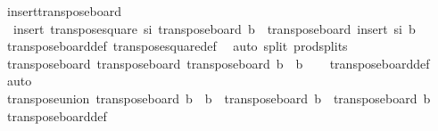 \begin{isabellebody}
\endisatagproof
{\isafoldproof}%
%
\isadelimproof
\isanewline
%
\endisadelimproof
\isanewline
{}\isamarkupfalse%
\ insert{\isacharunderscore}{\kern0pt}transpose{\isacharunderscore}{\kern0pt}board{\isacharcolon}{\kern0pt}\ \isanewline
\ \ {\isachardoublequoteopen}insert\ {\isacharparenleft}{\kern0pt}transpose{\isacharunderscore}{\kern0pt}square\ s\isactrlsub i{\isacharparenright}{\kern0pt}\ {\isacharparenleft}{\kern0pt}transpose{\isacharunderscore}{\kern0pt}board\ b{\isacharparenright}{\kern0pt}\ {\isacharequal}{\kern0pt}\ transpose{\isacharunderscore}{\kern0pt}board\ {\isacharparenleft}{\kern0pt}insert\ s\isactrlsub i\ b{\isacharparenright}{\kern0pt}{\isachardoublequoteclose}\isanewline
%
\isadelimproof
\ \ %
\endisadelimproof
%
\isatagproof
{}\isamarkupfalse%
\ transpose{\isacharunderscore}{\kern0pt}board{\isacharunderscore}{\kern0pt}def\ transpose{\isacharunderscore}{\kern0pt}square{\isacharunderscore}{\kern0pt}def\ \isamarkupfalse%
\ {\isacharparenleft}{\kern0pt}auto\ split{\isacharcolon}{\kern0pt}\ prod{\isachardot}{\kern0pt}splits{\isacharparenright}{\kern0pt}%
\endisatagproof
{\isafoldproof}%
%
\isadelimproof
\isanewline
%
\endisadelimproof
\isanewline
{}\isamarkupfalse%
\ transpose{\isacharunderscore}{\kern0pt}board{}{\isacharcolon}{\kern0pt}\ {\isachardoublequoteopen}transpose{\isacharunderscore}{\kern0pt}board\ {\isacharparenleft}{\kern0pt}transpose{\isacharunderscore}{\kern0pt}board\ b{\isacharparenright}{\kern0pt}\ {\isacharequal}{\kern0pt}\ b{\isachardoublequoteclose}\isanewline
%
\isadelimproof
\ \ %
\endisadelimproof
%
\isatagproof
{}\isamarkupfalse%
\ transpose{\isacharunderscore}{\kern0pt}board{\isacharunderscore}{\kern0pt}def\ \isamarkupfalse%
\ auto%
\endisatagproof
{\isafoldproof}%
%
\isadelimproof
\isanewline
%
\endisadelimproof
\isanewline
{}\isamarkupfalse%
\ transpose{\isacharunderscore}{\kern0pt}union{\isacharcolon}{\kern0pt}\ {\isachardoublequoteopen}transpose{\isacharunderscore}{\kern0pt}board\ {\isacharparenleft}{\kern0pt}b\ {\isasymunion}\ b\ {\isacharequal}{\kern0pt}\ transpose{\isacharunderscore}{\kern0pt}board\ b\ {\isasymunion}\ transpose{\isacharunderscore}{\kern0pt}board\ b\isanewline
%
\isadelimproof
\ \ %
\endisadelimproof
%
\isatagproof
{}\isamarkupfalse%
\ transpose{\isacharunderscore}{\kern0pt}board{\isacharunderscore}{\kern0pt}def\ \isamarkupfalse%

\end{isabellebody}
